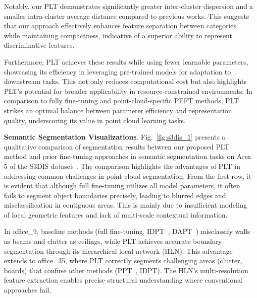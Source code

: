 Notably, our PLT demonstrates significantly greater inter-cluster dispersion and a smaller intra-cluster average distance compared to previous works. This suggests that our approach effectively enhances feature separation between categories while maintaining compactness, indicative of a superior ability to represent discriminative features.

Furthermore, PLT achieves these results while using fewer learnable parameters, showcasing its efficiency in leveraging pre-trained models for adaptation to downstream tasks. This not only reduces computational cost but also highlights PLT's potential for broader applicability in resource-constrained environments. In comparison to fully fine-tuning and point-cloud-specific PEFT methods, PLT strikes an optimal balance between parameter efficiency and representation quality, underscoring its value in point cloud learning tasks.

\textbf{Semantic Segmentation Visualizations}. Fig.~\ref{fig:s3dis_1} presents a qualitative comparison of segmentation results between our proposed PLT method and prior fine-tuning approaches in semantic segmentation tasks on Area 5 of the S3DIS dataset~\cite{armeni20163d}. The comparison highlights the advantages of PLT in addressing common challenges in point cloud segmentation. From the first row, it is evident that although full fine-tuning utilizes all model parameters, it often fails to segment object boundaries precisely, leading to blurred edges and misclassification in contiguous areas. This is mainly due to insufficient modeling of local geometric features and lack of multi-scale contextual information.


In office\_9, baseline methods (full fine-tuning, IDPT~\cite{zha2023instance}, DAPT~\cite{zhou2024dynamic}) misclassify walls as beams and clutter as ceilings, while PLT achieves accurate boundary segmentation through its hierarchical local network (HLN). This advantage extends to office\_35, where PLT correctly segments challenging areas (clutter, boards) that confuse other methods (PPT~\cite{zhang2024positional}, IDPT). The HLN's multi-resolution feature extraction enables precise structural understanding where conventional approaches fail.

